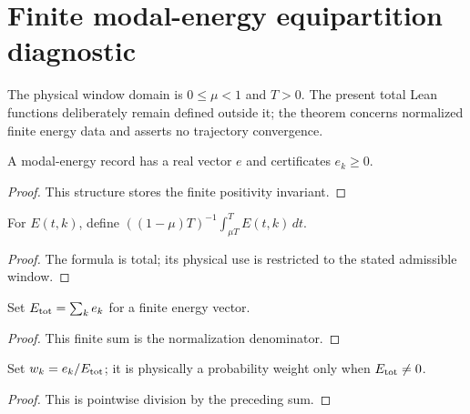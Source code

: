 
\chapter{Finite modal-energy equipartition diagnostic}
\label{ch:ArchonPhysics_Generated_problem_equipartition}

The physical window domain is $0\le\mu<1$ and $T>0$. The present total Lean functions deliberately remain defined outside it; the theorem concerns normalized finite energy data and asserts no trajectory convergence.

\begin{definition}
\label{def:equip:modal-energies}
A modal-energy record has a real vector $e$ and certificates $e_k\ge0$.
\end{definition}
\begin{proof}This structure stores the finite positivity invariant.\end{proof}

\begin{definition}
\label{def:equip:late-window}
For $E(t,k)$, define $((1-\mu)T)^{-1}\int_{\mu T}^{T}E(t,k)\,dt$.
\end{definition}
\begin{proof}The formula is total; its physical use is restricted to the stated admissible window.\end{proof}

\begin{definition}
\label{def:equip:total-energy}
Set $E_{\rm tot}=\sum_ke_k$ for a finite energy vector.
\end{definition}
\begin{proof}This finite sum is the normalization denominator.\end{proof}

\begin{definition}
\label{def:equip:normalized-weight}
Set $w_k=e_k/E_{\rm tot}$; it is physically a probability weight only when $E_{\rm tot}\ne0$.
\end{definition}
\begin{proof}This is pointwise division by the preceding sum.\end{proof}

